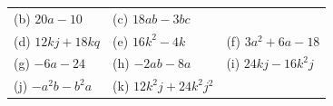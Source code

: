 \begin{enumerate}[noitemsep, label=\textbf{\arabic*}. ]
{{\begin{center}
\begin{xtabular}[t]{|l|l|l|}
        (b) $20a-10$ &
        (c) $18ab-3bc$%
     \tabularnewline{}
        (d) $12kj+18kq$ &
        (e) $16{k}^{2}-4k$ &
        (f) $3{a}^{2}+6a-18$%
     \tabularnewline{}
        (g) $-6a-24$ &
        (h) $-2ab-8a$ &
        (i) $24kj-16{k}^{2}j$%
     \tabularnewline{}
        (j) $-{a}^{2}b-{b}^{2}a$ &
        (k) $12{k}^{2}j+24{k}^{2}{j}^{2}$ &

\end{xtabular}
\end{center}}}
\end{enumerate}
